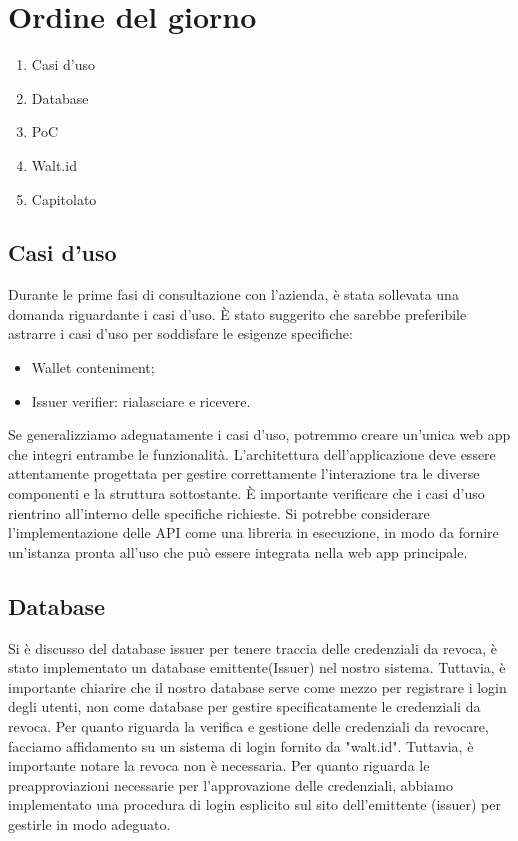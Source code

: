\section{Ordine del giorno}
\begin{enumerate}
\item Casi d'uso
\item Database
\item PoC
\item Walt.id
\item Capitolato
\end{enumerate}

\subsection{Casi d'uso}
Durante le prime fasi di consultazione con l'azienda, è stata sollevata una domanda riguardante i casi d'uso. È stato suggerito che sarebbe preferibile astrarre i casi d'uso per soddisfare le esigenze specifiche:
\begin{itemize}
  \item Wallet conteniment;
  \item Issuer verifier: rialasciare e ricevere.
\end{itemize}
Se generalizziamo adeguatamente i casi d'uso, potremmo creare un'unica web app che integri entrambe le funzionalità.
L'architettura dell'applicazione deve essere attentamente progettata per gestire correttamente l'interazione tra le diverse componenti e la struttura sottostante.
È importante verificare che i casi d'uso rientrino all'interno delle specifiche richieste.
Si potrebbe considerare l'implementazione delle API come una libreria in esecuzione, in modo da fornire un'istanza pronta all'uso che può essere integrata nella web app principale.


\subsection{Database}
Si è discusso del database issuer per tenere traccia delle credenziali da revoca, è stato implementato un database emittente(Issuer) nel nostro sistema. Tuttavia, è importante chiarire che il nostro database 
serve come mezzo per registrare i login degli utenti, non come database per gestire specificatamente le credenziali da revoca. 
Per quanto riguarda la verifica e gestione delle credenziali da revocare, facciamo affidamento su un sistema di login fornito da "walt.id".
Tuttavia, è importante notare la revoca non è necessaria. Per quanto riguarda le preapproviazioni necessarie per l'approvazione delle credenziali, abbiamo implementato una procedura di login esplicito sul sito dell'emittente (issuer) per gestirle in modo adeguato.

